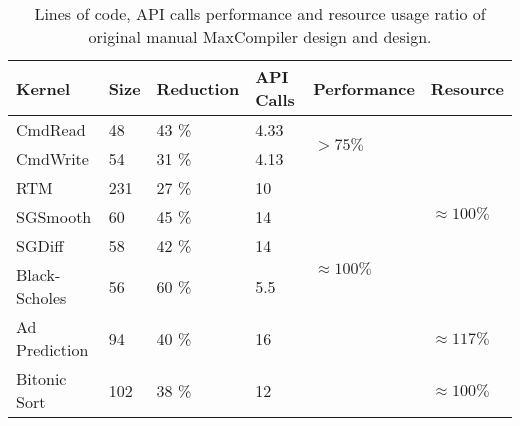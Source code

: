 \begin{table}
{\small
  \renewcommand{\arraystretch}{1.5}
  \begin{tabularx}{\linewidth}{X|X|X|X|X|X}
    \textbf{Kernel} & \textbf{Size} & \textbf{Reduction} & \textbf{API Calls} & \textbf{Performance}              & \textbf{Resource}
    \\
    \hline\hline
    CmdRead       & 48 & 43 \%               & 4.33                     & \multirow{2}{1.5cm}{$ > 75\%$}        & \multirow{6}{1.5cm}{$\approx 100\%$} \\
    CmdWrite      & 54  & 31 \%              & 4.13                     &                                   &                              \\
    \cline{1-4}
    RTM            & 231 & 27 \%              & 10                       & \multirow{5}{1.5cm}{$ \approx 100\%$} &                              \\
    SGSmooth      & 60 & 45 \%              & 14                       &                                   &                              \\
    SGDiff       & 58 & 42 \%              & 14                       &                                   &                              \\
    Black-Scholes & 56  & 60 \%               & 5.5                      &                                   &                              \\
    \cline{5-5}
    Ad Prediction & 94 & 40 \%             & 16                       &                                   &    $ \approx 117 \% $                          \\
    Bitonic Sort & 102 & 38 \%             & 12                    &                                   &    $ \approx 100 \% $                          \\
  \end{tabularx}
  \caption{Lines of code, API calls performance and resource usage ratio of original manual MaxCompiler design and \FAST{} design.}
  \label{table:benchmark}
}
\end{table}

